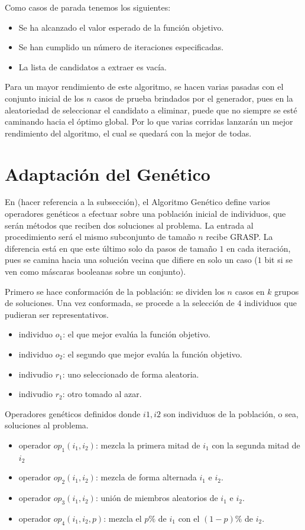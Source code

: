 \documentclass[a4paper,12pt]{book}
\begin{document}
		Como casos de parada tenemos los siguientes:
		\begin{itemize}
			\item Se ha alcanzado el valor esperado de la función objetivo.
			\item Se han cumplido un número de iteraciones especificadas.
			\item La lista de candidatos a extraer es vacía.
		\end{itemize}
	
		Para un mayor rendimiento de este algoritmo, se hacen varias pasadas con el conjunto inicial de los $n$ casos de prueba brindados por el generador, pues en la aleatoriedad de seleccionar el candidato a eliminar, puede que no siempre se esté caminando hacia el óptimo global. Por lo que varias corridas lanzarán un mejor rendimiento del algoritmo, el cual se quedará con la mejor de todas.
		
	\section{Adaptación del Genético}
		En (hacer referencia a la subsección), el Algoritmo Genético define varios operadores genéticos a efectuar sobre una población inicial de individuos, que serán métodos que reciben dos soluciones al problema. La entrada al procedimiento será el mismo subconjunto de tamaño $n$ recibe GRASP. La diferencia está en que este último solo da pasos de tamaño $1$ en cada iteración, pues se camina hacia una solución vecina que difiere en solo un caso ($1$ bit si se ven como máscaras booleanas sobre un conjunto).
		
		Primero se hace conformación de la población: se dividen los $n$ casos en $k$ grupos de soluciones. Una vez conformada, se procede a la selección de $4$ individuos que pudieran ser representativos.
		
		\begin{itemize}
			\item individuo $o_1$: el que mejor evalúa la función objetivo.
			\item individuo $o_2$: el segundo que mejor evalúa la función objetivo.
			\item indivudio $r_1$: uno seleccionado de forma aleatoria.
			\item indivudio $r_2$: otro tomado al azar.
		\end{itemize} 
	
		Operadores genéticos definidos donde $i1, i2$ son individuos de la población, o sea, soluciones al problema.
			\begin{itemize}
			\item operador $op_1(i_1, i_2)$: mezcla la primera mitad de $i_1$ con la segunda mitad de $i_2$ 
			\item operador $op_2(i_1, i_2)$: mezcla de forma alternada $i_1$ e $i_2$.
			\item operador $op_3(i_1, i_2)$: unión de miembros aleatorios de $i_1$ e $i_2$.
			\item operador $op_4(i_1, i_2, p)$: mezcla el $p\%$ de $i_1$ con el $(1-p)\%$ de $i_2$.
		\end{itemize}
	
\end{document}
